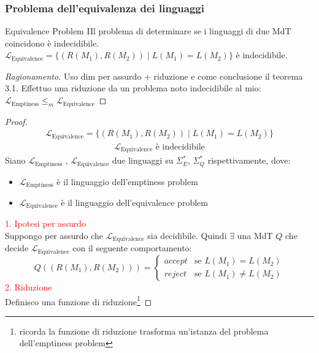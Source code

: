 \documentclass{article}  %
\theoremstyle{definition}
\newenvironment{ragionamento}[1][]
  {\begin{proof}[Ragionamento#1]\renewcommand{\qedsymbol}{}\normalfont}
  {\end{proof}}
\begin{document}
\subsubsection{Problema dell'equivalenza dei linguaggi}
\begin{theorem}{Equivalence Problem}
   IIl problema di determinare se i linguaggi di due MdT coincidono è indecidibile. \\
  $\mathcal{L}_{\text{Equivalence}} = \{(R(M_1),R(M_2)) \mid L(M_1)=L(M_2)\}$ è indecidibile.
  \footnotesize %
  \begin{ragionamento}
    Uso dim per assurdo + riduzione e come conclusione il teorema 3.1.
    Effettuo una riduzione da un problema noto indecidibile al mio: $\mathcal{L}_{\text{Emptiness}} \leq_m \mathcal{L}_{\text{Equivalence}}$
  \end{ragionamento}
  \begin{proof}
    \begin{align*}
      \mathcal{L}_{\text{Equivalence}} = \{(R(M_1),R(M_2)) \mid L(M_1)=L(M_2)\} \tag*{(ipotesi)}
    \end{align*}
    \begin{align*}
      \mathcal{L}_{\text{Equivalence}} \text{ è indecidibile} \tag*{(tesi)}
    \end{align*}
    Siano $\mathcal{L}_{\text{Emptiness}}$ , $\mathcal{L}_{\text{Equivalence}}$ due linguaggi su $\Sigma_E^*$, $\Sigma_Q^*$ rispettivamente, dove:
    \begin{itemize}
      \item $\mathcal{L}_{\text{Emptiness}}$ è il linguaggio dell'emptiness problem
      \item $\mathcal{L}_{\text{Equivalence}}$ è il linguaggio dell'equivalence problem
    \end{itemize}
    \textcolor{red}{1. Ipotesi per assurdo} \\
    Suppongo per assurdo che $\mathcal{L}_{\text{Equivalence}}$ sia decidibile. Quindi $\exists$ una MdT $Q$ che decide 
    $\mathcal{L}_{\text{Equivalence}}$ con il seguente comportamento:
    \[
    Q((R(M_1),R(M_2))) =
    \begin{cases}
      accept & \text{se } L(M_1)=L(M_2)\\
      reject & \text{se } L(M_1) \neq L(M_2)
    \end{cases}
    \]
    \textcolor{red}{2. Riduzione} \\
    Definisco una funzione di riduzione\footnote{ricorda la funzione di riduzione trasforma un'istanza del problema dell'emptiness problem 
}
\end{proof}
\end{theorem}
\end{document}
